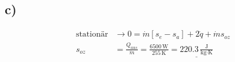 

\subsection*{c)}

\begin{align*}
\text{stationär} &\rightarrow 0 = \dot{m} [s_{e} - s_{a}] + 2 \dot{q} + \dot{m} s_{oz} \\
s_{oz} &= \frac{Q_{aus}}{\dot{m}} = \frac{6500 \, \text{W}}{255 \, \text{K}} = \underline{220.3 \, \frac{\text{J}}{\text{kg} \cdot \text{K}}}
\end{align*}